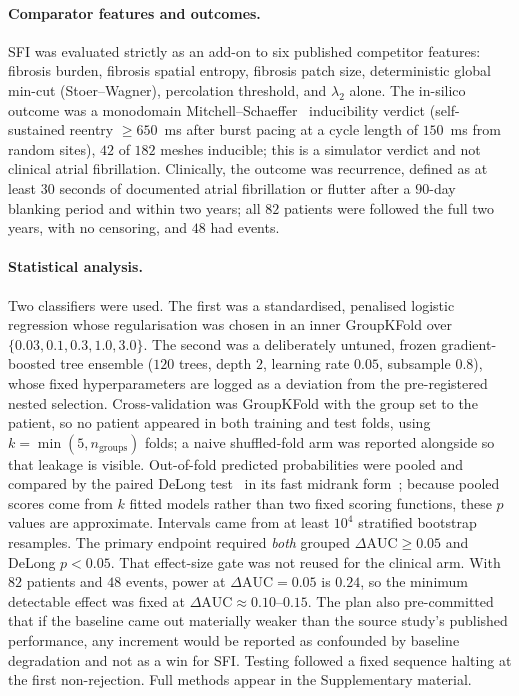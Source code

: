 \documentclass[11pt]{article}
\newcommand{\lam}{\lambda}
\newcommand{\dAUC}{\ensuremath{\Delta\mathrm{AUC}}}
\begin{document}
\paragraph{Comparator features and outcomes.} SFI was evaluated strictly as an
add-on to six published competitor features: fibrosis burden,
fibrosis spatial entropy, fibrosis patch size, deterministic global min-cut
(Stoer--Wagner), percolation threshold, and $\lam_2$ alone. The in-silico outcome
was a monodomain Mitchell--Schaeffer~\cite{mitchell2003} inducibility verdict (self-sustained reentry
$\geq650$~ms after burst pacing at a cycle length of $150$~ms from random sites),
$42$ of $182$ meshes inducible; this is a simulator verdict and not clinical
atrial fibrillation. Clinically, the outcome was recurrence, defined as at least
$30$ seconds of documented atrial fibrillation or flutter after a $90$-day
blanking period and within two years; all $82$ patients were followed the full
two years, with no censoring, and $48$ had events.

\paragraph{Statistical analysis.} Two classifiers were used. The first was a
standardised, penalised logistic regression whose regularisation was chosen in
an inner GroupKFold over $\{0.03,0.1,0.3,1.0,3.0\}$. The second was a
deliberately untuned, frozen gradient-boosted tree ensemble ($120$ trees, depth
$2$, learning rate $0.05$, subsample $0.8$), whose fixed hyperparameters are
logged as a deviation from the pre-registered nested selection. Cross-validation
was GroupKFold with the group set to the patient, so no patient appeared
in both training and test folds, using $k=\min(5,n_{\mathrm{groups}})$ folds; a
naive shuffled-fold arm was reported alongside so that leakage is visible.
Out-of-fold predicted probabilities were pooled and
compared by the paired DeLong test~\cite{delong1988} in its fast midrank form~\cite{sunxu2014};
because pooled scores come from $k$ fitted models
rather than two fixed scoring functions, these $p$ values are approximate.
Intervals came from at least $10^{4}$ stratified bootstrap resamples. The primary
endpoint required \emph{both} grouped $\dAUC\geq0.05$ and DeLong $p<0.05$. That
effect-size gate was not reused for the clinical arm. With $82$ patients and $48$
events, power at $\dAUC=0.05$ is $0.24$, so the minimum detectable effect was
fixed at $\dAUC\approx0.10$--$0.15$. The plan also pre-committed that if the
baseline came out materially weaker than the source study's published
performance, any increment would be reported as confounded by baseline
degradation and not as a win for SFI. Testing followed a fixed sequence halting
at the first non-rejection. Full methods appear in the Supplementary material.
\end{document}

